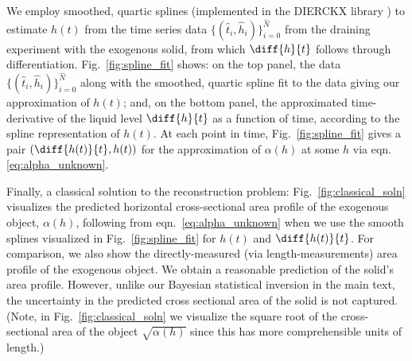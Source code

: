 \documentclass[a4paper,fleqn]{cas-sc}
\begin{document}
We employ smoothed, quartic splines (implemented in the DIERCKX library \cite{dierckx1995curve}) to estimate $h(t)$ from the time series data $\{(\hat{t}_i, \hat{h}_i)\}_{i=0}^{\hat{N}}$ from the draining experiment with the exogenous solid, from which $\diff{h}{t}$ follows through differentiation.
Fig.~\ref{fig:spline_fit} shows: on the top panel, the data $\{(\hat{t}_i, \hat{h}_i)\}_{i=0}^{\hat{N}}$ along with the smoothed, quartic spline fit to the data giving our approximation of $h(t)$; and, on the bottom panel, the approximated time-derivative of the liquid level $\diff{h}{t}$ as a function of time, according to the spline representation of $h(t)$. At each point in time, Fig.~\ref{fig:spline_fit} gives a pair $\left(\diff{h(t)}{t}, h(t)\right)$ for the approximation of $\alpha(h)$ at some $h$ via eqn.\ref{eq:alpha_unknown}.

Finally, a classical solution to the reconstruction problem: Fig.~\ref{fig:classical_soln} visualizes the predicted horizontal cross-sectional area profile of the exogenous object, $\alpha(h)$, following from eqn.~\ref{eq:alpha_unknown} when we use the smooth splines visualized in Fig.~\ref{fig:spline_fit} for $h(t)$ and $\diff{h(t)}{t}$. For comparison, we also show the directly-measured (via length-measurements) area profile of the exogenous object. 
We obtain a reasonable prediction of the solid's area profile. 
However, unlike our Bayesian statistical inversion in the main text, the uncertainty in the predicted cross sectional area of the solid is not captured.
(Note, in Fig.~\ref{fig:classical_soln} we visualize the square root of the cross-sectional area of the object $\sqrt{\alpha(h)}$ since this has more comprehensible units of length.)
\end{document}
